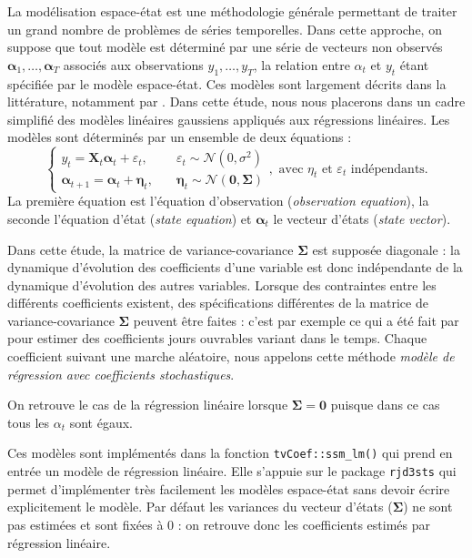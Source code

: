 \documentclass[
  a4paper,
  DIV=11,
  numbers=noendperiod,
  french]{scrartcl}
\newcommand\1{{\mathds 1}}
\newcommand{\bf}[1]{{\boldsymbol #1}}
\theoremstyle{remark}
\begin{document}
La modélisation espace-état est une méthodologie générale permettant de
traiter un grand nombre de problèmes de séries temporelles. Dans cette
approche, on suppose que tout modèle est déterminé par une série de
vecteurs non observés \(\bf \alpha_1,\dots,\bf\alpha_T\) associés aux
observations \(y_1,\dots,y_T\), la relation entre \(\alpha_t\) et
\(y_t\) étant spécifiée par le modèle espace-état. Ces modèles sont
largement décrits dans la littérature, notamment par
\textcite{durbinkoopman}. Dans cette étude, nous nous placerons dans un
cadre simplifié des modèles linéaires gaussiens appliqués aux
régressions linéaires. Les modèles sont déterminés par un ensemble de
deux équations : \[
\begin{cases}
y_t={\bf X_t}\bf\alpha_t+\varepsilon_t,\quad&\varepsilon_t\sim\mathcal N(0,\sigma^2)\\
\bf\alpha_{t+1}=\bf\alpha_t+\bf\eta_t,\quad&\bf\eta_t\sim\mathcal N(\bf 0,\bf\Sigma)
\end{cases},\text{ avec }\eta_t\text{ et }\varepsilon_t\text{ indépendants.}
\] La première équation est l'équation d'observation (\emph{observation
equation}), la seconde l'équation d'état (\emph{state equation}) et
\(\bf\alpha_t\) le vecteur d'états (\emph{state vector}).

Dans cette étude, la matrice de variance-covariance \(\bf\Sigma\) est
supposée diagonale : la dynamique d'évolution des coefficients d'une
variable est donc indépendante de la dynamique d'évolution des autres
variables. Lorsque des contraintes entre les différents coefficients
existent, des spécifications différentes de la matrice de
variance-covariance \(\bf\Sigma\) peuvent être faites : c'est par
exemple ce qui a été fait par \textcite{abs2006} pour estimer des
coefficients jours ouvrables variant dans le temps. Chaque coefficient
suivant une marche aléatoire, nous appelons cette méthode \emph{modèle
de régression avec coefficients stochastiques}.

On retrouve le cas de la régression linéaire lorsque \(\bf\Sigma=\bf 0\)
puisque dans ce cas tous les \(\alpha_t\) sont égaux.

Ces modèles sont implémentés dans la fonction \texttt{tvCoef::ssm\_lm()}
qui prend en entrée un modèle de régression linéaire. Elle s'appuie sur
le package \texttt{rjd3sts} \autocite{rjd3sts} qui permet d'implémenter
très facilement les modèles espace-état sans devoir écrire explicitement
le modèle. Par défaut les variances du vecteur d'états (\(\bf \Sigma\))
ne sont pas estimées et sont fixées à 0 : on retrouve donc les
coefficients estimés par régression linéaire.
\end{document}
